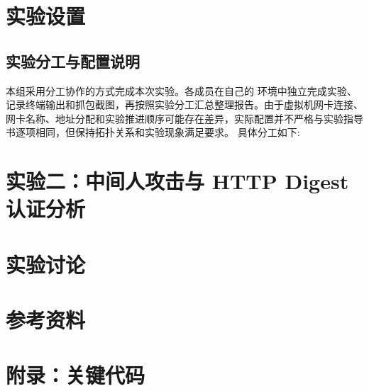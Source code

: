 \documentclass{lab1report}
\begin{document}
\makecover




\section{实验设置}

\subsection{实验分工与配置说明}

本组采用分工协作的方式完成本次实验。各成员在自己的 环境中独立完成实验、记录终端输出和抓包截图，再按照实验分工汇总整理报告。由于虚拟机网卡连接、网卡名称、地址分配和实验推进顺序可能存在差异，实际配置并不严格与实验指导书逐项相同，但保持拓扑关系和实验现象满足要求。
具体分工如下:




\section{实验二：中间人攻击与 HTTP Digest 认证分析}

\section{实验讨论}


\section{参考资料}
\printbibliography[heading=none]

\newpage
\appendix
\section{附录：关键代码}

\end{document}

